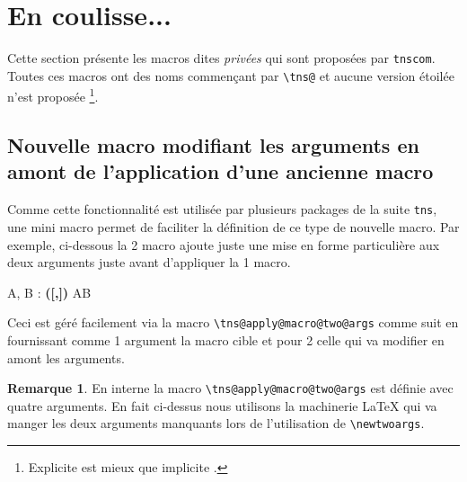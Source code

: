 \documentclass[12pt,a4paper]{article}
\newcommand\env[1]{\texttt{#1}}
\newcommand\macro[1]{\env{\textbackslash{}#1}}
\theoremstyle{definition}
\newtheorem*{remark}{Remarque}
\begin{document}
{{{{{{{{{{{%
\section{En coulisse...}

Cette section présente les macros dites \emph{\og privées \fg} qui sont proposées par \verb+tnscom+.
Toutes ces macros ont des noms commençant par \verb+\tns@+ et aucune version étoilée n'est proposée
\footnote{
	\og Explicite \fg{} est mieux que \og implicite \fg{}.
}.


\subsection{Nouvelle macro modifiant les arguments en amont de l'application d'une ancienne macro}

Comme cette fonctionnalité est utilisée par plusieurs packages de la suite \verb+tns+, une mini macro permet de faciliter la définition de ce type de nouvelle macro.
Par exemple, ci-dessous la 2\ieme{} macro ajoute juste une mise en forme particulière aux deux arguments juste avant d'appliquer la 1\iere{} macro.

\makeatletter
\newcommand\twoargs[2]{#1, #2}
\newcommand\modify[1]{\textbf{([#1])}}
\def\newtwoargs{\tns@apply@macro@two@args\twoargs\modify}
\makeatother

\begin{latexex}
\twoargs{A}{B} : \newtwoargs{A}{B}
\end{latexex}


Ceci est géré facilement via la macro \macro{tns@apply@macro@two@args} comme suit en fournissant comme 1\ier{} argument la macro cible et pour 2\ieme{} celle qui va modifier en amont les arguments.

\begin{latexex-alone}
\newcommand\twoargs[2]{#1, #2}
\newcommand\modify[1]{\textbf{([#1])}}

\def\newtwoargs{\tns@apply@macro@two@args\twoargs\modify}
\end{latexex-alone}


\begin{remark}
	En interne la macro \macro{tns@apply@macro@two@args} est définie avec quatre arguments.
	En fait ci-dessus nous utilisons la machinerie \LaTeX{} qui va manger les deux arguments manquants lors de l'utilisation de \macro{newtwoargs}.
\end{remark}



}}}}}}}}}}}
\end{document}
